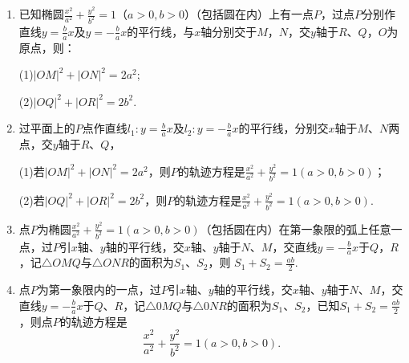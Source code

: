 \documentclass{article}
\begin{document}
\begin{enumerate}[label=\arabic*.]
\item 已知椭圆$\frac{x^2}{a^2} + \frac{y^2}{b^2} = 1$（$a>0,b>0$）（包括圆在内）上有一点$P$，过点$P$分别作直线$y=\frac{b}{a}x$及$y=-\frac{b}{a}x$的平行线，与$x$轴分别交于$M$，$N$，交$y$轴于$R$、$Q$，$O$为原点，则：

(1)$\left|OM\right|^2 + \left|ON\right|^2 = 2a^2$; 

(2)$\left|OQ\right|^2 + \left|OR\right|^2 = 2b^2$. 

\item 过平面上的$P$点作直线$l_1:y=\frac{b}{a}x$及$l_2:y=-\frac{b}{a}x$的平行线，分别交$x$轴于$M$、$N$两点，交$y$轴于$R$、$Q$，

(1)若$\left|OM\right|^2 + \left|ON\right|^2 = 2a^2$，则$P$的轨迹方程是$\frac{x^2}{a^2} + \frac{y^2}{b^2} = 1 \left(a > 0, b > 0\right)$；

(2)若$\left|OQ\right|^2 + \left|OR\right|^2 = 2b^2$，则$P$的轨迹方程是$\frac{x^2}{a^2} + \frac{y^2}{b^2} = 1 \left(a > 0, b > 0\right)$.

\item 点$P$为椭圆$\frac{x^2}{a^2} + \frac{y^2}{b^2} = 1 \left(a > 0, b > 0\right)$（包括圆在内）在第一象限的弧上任意一点，过$P$引$x$轴、$y$轴的平行线，交$x$轴、$y$轴于$N$、$M$，交直线$y=-\frac{b}{a}x$于$Q$，$R$，记$\triangle OMQ$与$\triangle ONR$的面积为$S_1$、$S_2$，则
$S_1 + S_2 = \frac{ab}{2}. $

\item 点$P$为第一象限内的一点，过$P$引$x$轴、$y$轴的平行线，交$x$轴、$y$轴于$N$、$M$，交直线$y=-\frac{b}{a}x$于$Q$、$R$，记$\triangle 0MQ$与$\triangle 0NR$的面积为$S_1$、$S_2$，已知$S_1 + S_2 = \frac{ab}{2}$，则点$P$的轨迹方程是$$\frac{x^2}{a^2} + \frac{y^2}{b^2} = 1 \left(a > 0, b > 0\right). $$

\end{enumerate}
\end{document}
